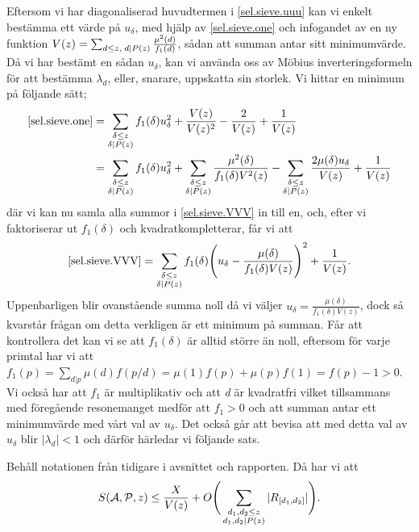 Eftersom vi har diagonaliserad huvudtermen i \eqref{sel.sieve.uuu} kan vi enkelt bestämma ett värde på \(u_\delta\), med hjälp av \eqref{sel.sieve.one} och infogandet av en ny funktion \(V(z) = \sum_{d\leq z,\; d\mid P(z)}\frac{\mu^2(d)}{f_1(d)}\), sådan att summan antar sitt minimumvärde.
Då vi har bestämt en sådan \(u_\delta\), kan vi använda oss av Möbius inverteringsformeln för att bestämma \(\lambda_d\), eller, snarare, uppskatta sin storlek.
Vi hittar en minimum på följande sätt;
\begin{align}
    \eqref{sel.sieve.one} &= \sum_{\substack{\delta\leq z\\\delta|P(z)}} f_1(\delta)u_\delta^2 + \frac{V(z)}{V(z)^2} - \frac{2}{V(z)} + \frac{1}{V(z)}\nonumber\\
    &= \sum_{\substack{\delta\leq z\\\delta|P(z)}} f_1(\delta)u_\delta^2 + \sum_{\substack{\delta\leq z\\ \delta|P(z)}}\frac{\mu^2(\delta)}{f_1(\delta)V^2(z)} - \sum_{\substack{\delta\leq z\\\delta |P(z)}}\frac{2\mu(\delta)u_\delta}{V(z)} + \frac{1}{V(z)}\label{sel.sieve.VVV}
\end{align}
där vi kan nu samla alla summor i \eqref{sel.sieve.VVV} in till en, och, efter vi faktoriserar ut \(f_1(\delta)\) och kvadratkompletterar, får vi att
\begin{equation}
    \eqref{sel.sieve.VVV} = \sum_{\substack{\delta\leq z\\\delta|P(z)}}f_1(\delta)\Bigg(u_\delta - \frac{\mu(\delta)}{f_1(\delta)V(z)}\Bigg)^2 + \frac{1}{V(z)}.\nonumber
\end{equation}
Uppenbarligen blir ovanstående summa noll då vi väljer \(u_\delta = \frac{\mu(\delta)}{f_1(\delta)V(z)}\), dock så kvarstår frågan om detta verkligen är ett minimum på summan. Får att kontrollera det kan vi se att \(f_1(\delta)\) är alltid större än noll, eftersom för varje primtal har vi att \(f_1(p) = \sum_{d|p}\mu(d)f({p}/{d}) = \mu(1)f(p) + \mu(p)f(1) = f(p) - 1 > 0\). 
Vi också har att \(f_1\) är multiplikativ och att \textit{d} är kvadratfri vilket tillsammans med föregående resonemanget medför att \(f_1 > 0\) och att summan antar ett minimumvärde med vårt val av \(u_\delta\).
Det också går att bevisa \cite[s. 122-123]{cojocarumurty} att med detta val av \(u_\delta\) blir \(|\lambda_d| < 1\) och därför härledar vi följande sats.
\begin{theorem}\label{sel.sieve.thm}
Behåll notationen från tidigare i avsnittet och rapporten. Då har vi att
\begin{equation}
    S(\mathcal{A}, \mathcal{P}, z) \leq \frac{X}{V(z)} + O\Bigg(\sum_{\substack{d_1,d_2\leq z\\d_1,d_2\mid P(z)}}|R_{[d_1, d_2]}|\Bigg).\nonumber
\end{equation}
\end{theorem}
